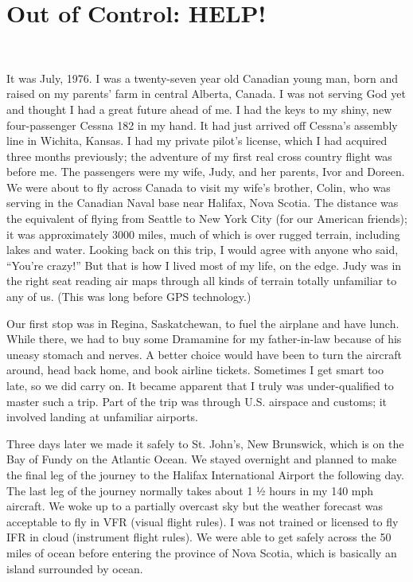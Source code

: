 \documentclass[twoside, 12pt]{book}
\begin{document}
\clearpage

\tableofcontents
\clearpage
\mainmatter
\chapter{Out of Control: HELP!}
\

It was July, 1976. I was a twenty-seven year old Canadian young man, born and raised on my parents’ farm in central Alberta, Canada. I was not serving God yet and thought I had a great future ahead of me. I had the keys to my shiny, new four-passenger Cessna 182 in my hand. It had just arrived off Cessna's assembly line in Wichita, Kansas. I had my private pilot's license, which I had acquired three months previously; the adventure of my first real cross country flight was before me. The passengers were my wife, Judy, and her parents, Ivor and Doreen. We were about to fly across Canada to visit my wife's brother, Colin, who was serving in the Canadian Naval base near Halifax, Nova Scotia. The distance was the equivalent of flying from Seattle to New York City (for our American friends); it was approximately 3000 miles, much of which is over rugged terrain, including lakes and water. Looking back on this trip, I would agree with anyone who said, “You’re crazy!” But that is how I lived most of my life, on the edge. Judy was in the right seat reading air maps through all kinds of terrain totally unfamiliar to any of us. (This was long before GPS technology.)

Our first stop was in Regina, Saskatchewan, to fuel the airplane and have lunch. While there, we had to buy some Dramamine for my father-in-law because of his uneasy stomach and nerves. A better choice would have been to turn the aircraft around, head back home, and book airline tickets. Sometimes I get smart too late, so we did carry on. It became apparent that I truly was under-qualified to master such a trip. Part of the trip was through U.S. airspace and customs; it involved landing at unfamiliar airports.

Three days later we made it safely to St. John’s, New Brunswick, which is on the Bay of Fundy on the Atlantic Ocean. We stayed overnight and planned to make the final leg of the journey to the Halifax International Airport the following day. The last leg of the journey normally takes about 1 ½ hours in my 140 mph aircraft. We woke up to a partially overcast sky but the weather forecast was acceptable to fly in VFR (visual flight rules). I was not trained or licensed to fly IFR in cloud (instrument flight rules). We were able to get safely across the 50 miles of ocean before entering the province of Nova Scotia, which is basically an island surrounded by ocean.
\end{document}
